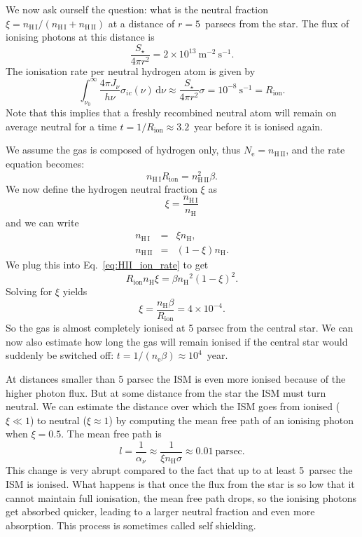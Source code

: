 \documentclass[12pt]{article}
\numberwithin{equation}{section}
\def\dd{\mathrm{d}}
\def\Jnu{\ensuremath{J_{\nu}}}
\def\anu{\ensuremath{\alpha_{\nu}}}
\def\nelec{\ensuremath{n_\mathrm{e}}}
\newcommand{\be}{\begin{equation}}
\newcommand{\ee}{\end{equation}}
\newcommand{\bea}{\begin{eqnarray}}
\newcommand{\eea}{\end{eqnarray}}
\def\nH{\ensuremath{n_\mathrm{H}}}
\def\nHI{\ensuremath{n_\mathrm{H \, I}}}
\def\nHII{\ensuremath{n_\mathrm{H\, II}}}
\begin{document}
We now ask ourself the question: what is the neutral fraction $\xi= \nHI/(\nHI + \nHII)$ at a distance of $r=5$~parsecs from the star. The flux of ionising photons at this distance is
\be
\frac{S_\star}{4 \pi r^2} = 2 \times 10^{13}\ \mathrm{m}^{-2} \ \mathrm{s}^{-1}.
\ee
The ionisation rate per neutral hydrogen atom is given by
\be
\int_{\nu_0}^\infty \frac{4 \pi \Jnu }{h \nu} \sigma_{ic}(\nu) \, \dd \nu \approx \frac{S_\star}{4 \pi r^2} \sigma = 10^{-8} \ \mathrm{s}^{-1} = R_\mathrm{ion}.
\ee
Note that this implies that a freshly recombined neutral atom will remain on average neutral for a time $t=1/R_\mathrm{ion}\approx 3.2$~year before it is ionised again.

We assume the gas is composed of hydrogen only, thus $N_\mathrm{e} = n_\mathrm{H\, II}$, and the rate equation becomes:
\be \label{eq:HII_ion_rate}
\nHI R_\mathrm{ion} = n_\mathrm{H\, II}^2 \beta.
\ee
We now define the hydrogen neutral fraction $\xi$ as
\be
\xi = \frac{\nHI}{\nH}
\ee
and we can write 
\bea
\nHI &=& \xi \nH, \nonumber \\
\nHII &=& (1-\xi) \nH.
\eea
We plug this into Eq.~\ref{eq:HII_ion_rate} to get
\be
R_\mathrm{ion} \nH \xi =  \beta \nH^2 (1-\xi)^2.
\ee
Solving for $\xi$ yields
\be
\xi = \frac{\nH \beta}{R_\mathrm{ion}} = 4 \times 10^{-4}.
\ee
So the gas is almost completely ionised at 5 parsec from the central star. We can now also estimate how long the gas will remain ionised if the central star would suddenly be switched off: $t=1/(\nelec \beta) \approx 10^4$~year.

At distances smaller than 5 parsec the ISM is even more ionised because of the higher photon flux. But at some distance from the star the ISM must turn neutral. We can estimate the distance over which the ISM goes from ionised ($\xi \ll 1$) to neutral ($\xi \approx 1$) by computing the mean free path of an ionising photon when $\xi=0.5$. The mean free path is
\be
l = \frac{1}{\anu} \approx \frac{1}{\xi \nH \sigma} \approx 0.01~\mathrm{parsec}.
\ee 
This change is very abrupt compared to the fact that up to at least 5~parsec the ISM is ionised. What happens is that once the flux from the star is so low that it cannot maintain full ionisation, the mean free path drops, so the ionising photons get absorbed quicker, leading to a larger neutral fraction and even more absorption. This process is sometimes called self shielding.
\end{document}
